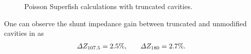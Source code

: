 \documentclass[a4paper,oneside,12pt]{report}
\numberwithin{equation}{chapter}
\begin{document}
\begin{figure}[H]
    \centering
    \vspace{20pt}
    \vspace{20pt}
    \caption{\centering Poisson Superfish calculations with truncated cavities.} 
    \label{fig:180_cavity_shunt_diff}
\end{figure}
One can observe the shunt impedance gain between truncated and unmodified cavities in  as
\vspace{-10pt}\begin{equation}
    \begin{aligned}
        \Delta Z_{107.5}=2.5\%   ,
    \end{aligned}
    \qquad
    \begin{aligned}
        \Delta Z_{180}=2.7\% .
    \end{aligned}
\vspace{-10pt}\end{equation}


\clearpage
\end{document}

